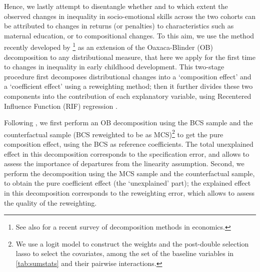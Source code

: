 Hence, we lastly attempt to disentangle whether and to which extent the observed changes in inequality in socio-emotional skills across the two cohorts can be attributed to changes in returns (or penalties) to characteristics such as maternal education, or to compositional changes. To this aim, we use the method recently developed by \citet{firpo2018decomposing}\footnote{See also \citet{fortin2011decomposition} for a recent survey of decomposition methods in economics.} as an extension of the Oaxaca-Blinder (OB) decomposition to any distributional measure, that here we apply for the first time to changes in inequality in early childhood development. This two-stage procedure first decomposes distributional changes into a `composition effect' and a `coefficient effect' using a reweighting method; then it further divides these two components into the contribution of each explanatory variable, using Recentered Influence Function (RIF) regression \citep{firpo2009unconditional}.

Following \citet{firpo2018decomposing}, we first perform an OB decomposition using the BCS sample and the counterfactual sample (BCS reweighted to be as MCS)\footnote{We use a logit model to construct the weights and the post-double selection lasso \citep{belloni2012sparse} to select the covariates, among the set of the baseline variables in \autoref{tab:sumstats} and their pairwise interactions.} to get the pure composition effect, using the BCS as reference coefficients. The total unexplained effect in this decomposition corresponds to the specification error, and allows to assess the importance of departures from the linearity assumption. Second, we perform the decomposition using the MCS sample and the counterfactual sample, to obtain the pure coefficient effect (the `unexplained' part); the explained effect in this decomposition corresponds to the reweighting error, which allows to assess the quality of the reweighting.


